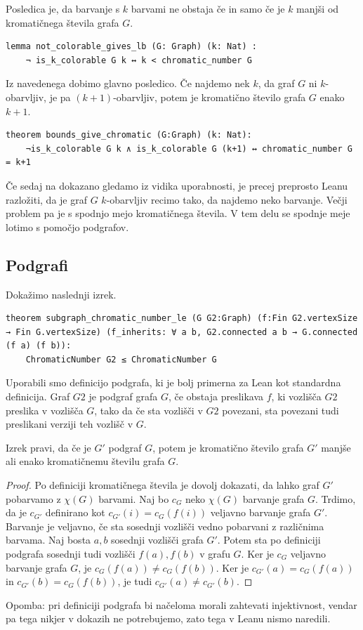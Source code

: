 \documentclass[mat1]{fmfdelo}
\begin{document}
Posledica je, da barvanje s $k$ barvami ne obstaja če in samo če je $k$ manjši od kromatičnega števila grafa $G$.
\begin{lstlisting}
lemma not_colorable_gives_lb (G: Graph) (k: Nat) :
    ¬ is_k_colorable G k ↔ k < chromatic_number G
\end{lstlisting}

Iz navedenega dobimo glavno posledico.
Če najdemo nek $k$, da graf $G$ ni $k$-obarvljiv, je pa $(k+1)$-obarvljiv, potem je kromatično število grafa $G$ enako $k+1$.
\begin{lstlisting}
theorem bounds_give_chromatic (G:Graph) (k: Nat):
    ¬is_k_colorable G k ∧ is_k_colorable G (k+1) ↔ chromatic_number G = k+1
\end{lstlisting}

Če sedaj na dokazano gledamo iz vidika uporabnosti, je precej preprosto Leanu razložiti, da je graf $G$ $k$-obarvljiv
recimo tako, da najdemo neko barvanje. Večji problem pa je s spodnjo mejo kromatičnega števila. 
V tem delu se spodnje meje lotimo s pomočjo podgrafov.

\subsection{Podgrafi}
Dokažimo naslednji izrek.
\begin{lstlisting}
theorem subgraph_chromatic_number_le (G G2:Graph) (f:Fin G2.vertexSize → Fin G.vertexSize) (f_inherits: ∀ a b, G2.connected a b → G.connected (f a) (f b)):
    ChromaticNumber G2 ≤ ChromaticNumber G
\end{lstlisting}
Uporabili smo definicijo podgrafa, ki je bolj primerna za Lean kot standardna definicija.
Graf $G2$ je podgraf grafa $G$, če obstaja preslikava $f$, ki vozlišča $G2$ preslika v vozlišča $G$, tako 
da če sta vozlišči v $G2$ povezani, sta povezani tudi preslikani verziji teh vozlišč v $G$.

Izrek pravi, da če je $G'$ podgraf $G$, potem je kromatično število grafa $G'$ manjše ali enako kromatičnemu številu grafa $G$.
\begin{proof}
Po definiciji kromatičnega števila je dovolj dokazati, da lahko graf $G'$ pobarvamo z $\chi(G)$ barvami. Naj bo $c_G$ 
neko $\chi(G)$ barvanje grafa $G$. Trdimo, da je $c_{G'}$ definirano kot $c_{G'}(i) = c_G(f(i))$ veljavno barvanje grafa $G'$. 
Barvanje je veljavno, če sta sosednji vozlišči vedno pobarvani z različnima barvama. Naj bosta $a, b$ sosednji vozlišči grafa $G'$.
Potem sta po definiciji podgrafa sosednji tudi vozlišči $f(a), f(b)$ v grafu $G$. Ker je $c_G$ veljavno barvanje grafa $G$, je 
$c_G(f(a))\neq c_G(f(b))$. Ker je $c_{G'}(a) = c_G(f(a))$ in $c_{G'}(b) = c_G(f(b))$, je tudi $c_{G'}(a)\neq c_{G'}(b)$.
\end{proof}
Opomba: pri definiciji podgrafa bi načeloma morali zahtevati injektivnost, vendar pa tega nikjer v dokazih ne potrebujemo, zato
tega v Leanu nismo naredili. 
\end{document}
